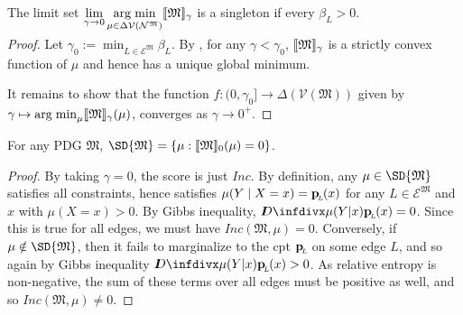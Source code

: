 \documentclass{article}
\DeclareMathOperator*{\argmin}{arg\;min}
\newcommand{\dg}[1]{\mathfrak{#1}}
\def\inco{\mathit{Inc}}
\newcommand{\bp}[1][L]{\mat{p}_{\!_{#1}\!}}
\newcommand{\V}{\mathcal V}
\newcommand{\N}{\mathcal N}
\newcommand{\Ed}{\mathcal E}
\begin{document}
    \begin{prop}
        The limit set
        \(\displaystyle \smash{\lim_{\gamma\to0}\argmin_{\mu \in \Delta\V(\N^{\dg M})}}  \bbr{\dg M}_\gamma\)
        is a singleton if every $\beta_L > 0$.
    \end{prop}
    \begin{proof}
        Let $\gamma_0 := \min_{L \in \Ed^{\dg M}} \beta_L$.
        By , for any $\gamma < \gamma_0$, $\bbr{\dg M}_\gamma$ is a strictly convex function of $\mu$ and hence has a unique global minimum. 

        It remains to show that the function $f : (0, \gamma_0] \to \Delta(\V(\dg M))$ given by $\gamma \mapsto \argmin_{\mu} \bbr{\dg M}_\gamma(\mu)$, converges as $\gamma \to 0^+$.
        \todo{}

        
    \end{proof}

    \begin{prop}\label{prop:sd-is-zeroset}
        For any PDG $\dg M$, $\SD{\dg M} = \{ \mu : \bbr{\dg M}_0(\mu) = 0\}$.
    \end{prop}
    \begin{proof}
         By taking $\gamma = 0$, the score is just $\inco$. By  definition, any $\mu \in \SD{\dg M}$ satisfies all constraints, hence satisfies $\mu(Y \mid X=x) = \bp(x)$ for any $L \in \Ed^{\dg M}$ and $x$ with $\mu(X=x)>0$. By Gibbs inequality, $\kldiv{\mu(Y|x)}{\bp(x)} = 0$. Since this is true for all edges, we must have $\inco(\dg M, \mu) = 0$. Conversely, if $\mu \notin \SD{\dg M}$, then it fails to marginalize to the cpt $\bp$ on some edge $L$, and so again by Gibbs inequality $\kldiv{\mu(Y|x)}{\bp(x)} > 0$. As relative entropy is non-negative, the sum of these terms over all edges must be positive as well, and so $\inco(\dg M, \mu) \neq 0$. %
    \end{proof}
\end{document}
